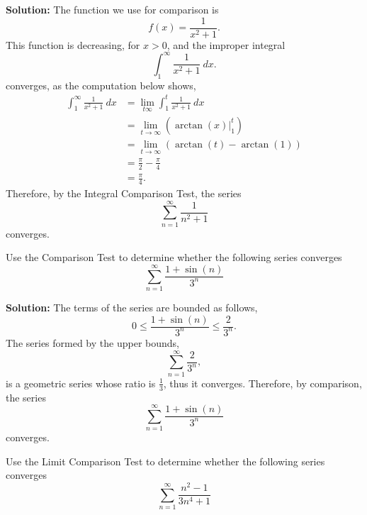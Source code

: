 \documentclass[11pt]{exam}
\begin{document}
\begin{questions}
\textbf{Solution:} The function we use for comparison is 
\begin{equation*}
f(x)=\frac{1}{x^2+1}.
\end{equation*}
This function is decreasing, for $x>0$, and the improper integral
\begin{equation*}
\int_{1}^{\infty} \frac{1}{x^2+1} \ dx. 
\end{equation*}
converges, as the computation below shows, 
\begin{align*}
\int_{1}^{\infty} \frac{1}{x^2+1} \ dx & = \lim_{t \infty} \int_{1}^{t} \frac{1}{x^2+1} \ dx \\
& = \lim_{t \to \infty} \left( \arctan(x) \Big|_{1}^{t} \right) \\
& = \lim_{t \to \infty} (\arctan(t)-\arctan(1))\\
& = \frac{\pi}{2} -\frac{\pi}{4}\\ 
& = \frac{\pi}{4}.
\end{align*}
Therefore, by the Integral Comparison Test, the series 
\begin{equation*}
\sum_{n=1}^{\infty} \frac{1}{n^2+1}
\end{equation*}
converges.

\newpage
\addpoints
\question[2] Use the Comparison Test to determine whether the following series converges
\begin{equation*}
\sum_{n=1}^{\infty} \frac{1+\sin(n)}{3^n}
\end{equation*}

\textbf{Solution:} The terms of the series are bounded as follows, 
\begin{equation*}
0 \leq \frac{1+ \sin(n)}{3^n} \leq \frac{2}{3^n}.
\end{equation*}
The series formed by the upper bounds, 
\begin{equation*}
\sum_{n=1}^{\infty} \frac{2}{3^n},
\end{equation*}
is a geometric series whose ratio is $\frac{1}{3}$, thus it converges. Therefore, by comparison, the series 
\begin{equation*}
\sum_{n=1}^{\infty} \frac{1+\sin(n)}{3^n}
\end{equation*}
converges. 


\newpage
\addpoints
\question[2] Use the Limit Comparison Test to determine whether the following series converges
\begin{equation*}
\sum_{n=1}^{\infty} \frac{n^2-1}{3n^4+1}
\end{equation*}


\end{questions}
\end{document}
